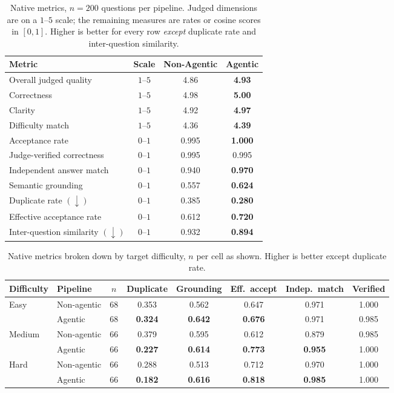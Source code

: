 \begin{table}[H]
\centering
\caption{Native metrics, $n{=}200$ questions per pipeline. Judged dimensions are
on a $1$--$5$ scale; the remaining measures are rates or cosine scores in
$[0,1]$. Higher is better for every row \emph{except} duplicate rate and
inter-question similarity.}
\label{tab:native-overall}
\small
\begin{tabular}{|l|c|c|c|}
\hline
\textbf{Metric} & \textbf{Scale} & \textbf{Non-Agentic} & \textbf{Agentic} \\
\hline
Overall judged quality        & $1$--$5$ & 4.86 & \textbf{4.93} \\
Correctness                   & $1$--$5$ & 4.98 & \textbf{5.00} \\
Clarity                       & $1$--$5$ & 4.92 & \textbf{4.97} \\
Difficulty match              & $1$--$5$ & 4.36 & \textbf{4.39} \\
\hline
Acceptance rate               & $0$--$1$ & 0.995 & \textbf{1.000} \\
Judge-verified correctness    & $0$--$1$ & 0.995 & 0.995 \\
Independent answer match      & $0$--$1$ & 0.940 & \textbf{0.970} \\
Semantic grounding            & $0$--$1$ & 0.557 & \textbf{0.624} \\
Duplicate rate $(\downarrow)$ & $0$--$1$ & 0.385 & \textbf{0.280} \\
Effective acceptance rate     & $0$--$1$ & 0.612 & \textbf{0.720} \\
Inter-question similarity $(\downarrow)$ & $0$--$1$ & 0.932 & \textbf{0.894} \\
\hline
\end{tabular}
\end{table}

\begin{table}[H]
\centering
\caption{Native metrics broken down by target difficulty, $n$ per cell as shown.
Higher is better except duplicate rate.}
\label{tab:native-difficulty}
\footnotesize
\setlength{\tabcolsep}{4pt}
\begin{tabular}{|l|l|c|c|c|c|c|c|}
\hline
\textbf{Difficulty} & \textbf{Pipeline} & \textbf{$n$} & \textbf{Duplicate}
 & \textbf{Grounding} & \textbf{Eff.\ accept} & \textbf{Indep.\ match}
 & \textbf{Verified} \\
\hline
Easy   & Non-agentic & 68 & 0.353 & 0.562 & 0.647 & 0.971 & 1.000 \\
       & Agentic     & 68 & \textbf{0.324} & \textbf{0.642} & \textbf{0.676} & 0.971 & 0.985 \\
\hline
Medium & Non-agentic & 66 & 0.379 & 0.595 & 0.612 & 0.879 & 0.985 \\
       & Agentic     & 66 & \textbf{0.227} & \textbf{0.614} & \textbf{0.773} & \textbf{0.955} & 1.000 \\
\hline
Hard   & Non-agentic & 66 & 0.288 & 0.513 & 0.712 & 0.970 & 1.000 \\
       & Agentic     & 66 & \textbf{0.182} & \textbf{0.616} & \textbf{0.818} & \textbf{0.985} & 1.000 \\
\hline
\end{tabular}
\end{table}

